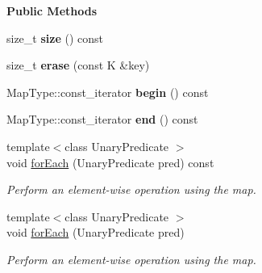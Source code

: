 \begin{Indent}\textbf{ Public Methods}\par
\begin{DoxyCompactItemize}
\item 
\mbox{\label{classrev_1_1_threaded_map_a87813be39cef3a959a377a624dfd15cf}} 
size\+\_\+t {\bfseries size} () const
\item 
\mbox{\label{classrev_1_1_threaded_map_a2e709714aed0bbad96ae98e07830e44f}} 
size\+\_\+t {\bfseries erase} (const K \&key)
\item 
\mbox{\label{classrev_1_1_threaded_map_a6641412ad58d9c99ec0904ef64b0eed5}} 
Map\+Type\+::const\+\_\+iterator {\bfseries begin} () const
\item 
\mbox{\label{classrev_1_1_threaded_map_a847e31db6dd3c8cc17b2df802c05fe5f}} 
Map\+Type\+::const\+\_\+iterator {\bfseries end} () const
\item 
\mbox{\label{classrev_1_1_threaded_map_a3b87a63fd236ce259464310f3b76cc45}} 
{\footnotesize template$<$class Unary\+Predicate $>$ }\\void \mbox{\hyperlink{classrev_1_1_threaded_map_a3b87a63fd236ce259464310f3b76cc45}{for\+Each}} (Unary\+Predicate pred) const
\begin{DoxyCompactList}\small\item\em Perform an element-\/wise operation using the map. \end{DoxyCompactList}\item 
\mbox{\label{classrev_1_1_threaded_map_a69c5826f96b8950c46b3e2f2e3519a65}} 
{\footnotesize template$<$class Unary\+Predicate $>$ }\\void \mbox{\hyperlink{classrev_1_1_threaded_map_a69c5826f96b8950c46b3e2f2e3519a65}{for\+Each}} (Unary\+Predicate pred)
\begin{DoxyCompactList}\small\item\em Perform an element-\/wise operation using the map. \end{DoxyCompactList}\item 
\mbox{\label{classrev_1_1_threaded_map_a00cb8a67b38b0f654c7a5833e82f3c71}} 

\end{DoxyCompactItemize}
\end{Indent}
